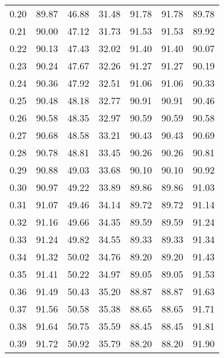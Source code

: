 \begin{tabular}{|c|c|c|c|c|c|c|}
      0.20 &     89.87 &     46.88 &      31.48 &   91.78 &      91.78 &         89.78 \\
      0.21 &     90.00 &     47.12 &      31.73 &   91.53 &      91.53 &         89.92 \\
      0.22 &     90.13 &     47.43 &      32.02 &   91.40 &      91.40 &         90.07 \\
      0.23 &     90.24 &     47.67 &      32.26 &   91.27 &      91.27 &         90.19 \\
      0.24 &     90.36 &     47.92 &      32.51 &   91.06 &      91.06 &         90.33 \\
      0.25 &     90.48 &     48.18 &      32.77 &   90.91 &      90.91 &         90.46 \\
      0.26 &     90.58 &     48.35 &      32.97 &   90.59 &      90.59 &         90.58 \\
      0.27 &     90.68 &     48.58 &      33.21 &   90.43 &      90.43 &         90.69 \\
      0.28 &     90.78 &     48.81 &      33.45 &   90.26 &      90.26 &         90.81 \\
      0.29 &     90.88 &     49.03 &      33.68 &   90.10 &      90.10 &         90.92 \\
      0.30 &     90.97 &     49.22 &      33.89 &   89.86 &      89.86 &         91.03 \\
      0.31 &     91.07 &     49.46 &      34.14 &   89.72 &      89.72 &         91.14 \\
      0.32 &     91.16 &     49.66 &      34.35 &   89.59 &      89.59 &         91.24 \\
      0.33 &     91.24 &     49.82 &      34.55 &   89.33 &      89.33 &         91.34 \\
      0.34 &     91.32 &     50.02 &      34.76 &   89.20 &      89.20 &         91.43 \\
      0.35 &     91.41 &     50.22 &      34.97 &   89.05 &      89.05 &         91.53 \\
      0.36 &     91.49 &     50.43 &      35.20 &   88.87 &      88.87 &         91.63 \\
      0.37 &     91.56 &     50.58 &      35.38 &   88.65 &      88.65 &         91.71 \\
      0.38 &     91.64 &     50.75 &      35.59 &   88.45 &      88.45 &         91.81 \\
      0.39 &     91.72 &     50.92 &      35.79 &   88.20 &      88.20 &         91.90 \\

\end{tabular}
